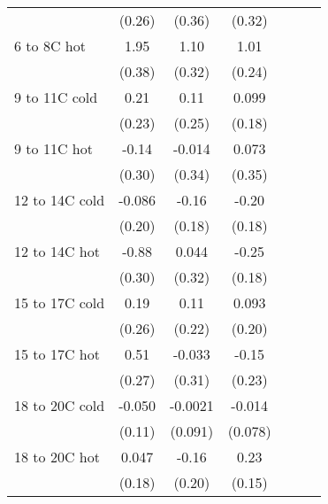 \documentclass[paper=letterpaper, fontsize=11pt]{article} %
\begin{document}
\begin{longtable}{l*{6}{c}}
                    &      (0.26)&      (0.36)&      (0.32)&            &            &            \\
6 to 8C hot         &        1.95&        1.10&        1.01&            &            &            \\
                    &      (0.38)&      (0.32)&      (0.24)&            &            &            \\
9 to 11C cold       &        0.21&        0.11&       0.099&            &            &            \\
                    &      (0.23)&      (0.25)&      (0.18)&            &            &            \\
9 to 11C hot        &       -0.14&      -0.014&       0.073&            &            &            \\
                    &      (0.30)&      (0.34)&      (0.35)&            &            &            \\
12 to 14C cold      &      -0.086&       -0.16&       -0.20&            &            &            \\
                    &      (0.20)&      (0.18)&      (0.18)&            &            &            \\
12 to 14C hot       &       -0.88&       0.044&       -0.25&            &            &            \\
                    &      (0.30)&      (0.32)&      (0.18)&            &            &            \\
15 to 17C cold      &        0.19&        0.11&       0.093&            &            &            \\
                    &      (0.26)&      (0.22)&      (0.20)&            &            &            \\
15 to 17C hot       &        0.51&      -0.033&       -0.15&            &            &            \\
                    &      (0.27)&      (0.31)&      (0.23)&            &            &            \\
18 to 20C cold      &      -0.050&     -0.0021&      -0.014&            &            &            \\
                    &      (0.11)&     (0.091)&     (0.078)&            &            &            \\
18 to 20C hot       &       0.047&       -0.16&        0.23&            &            &            \\
                    &      (0.18)&      (0.20)&      (0.15)&            &            &            \\

\end{longtable}
\end{document}
